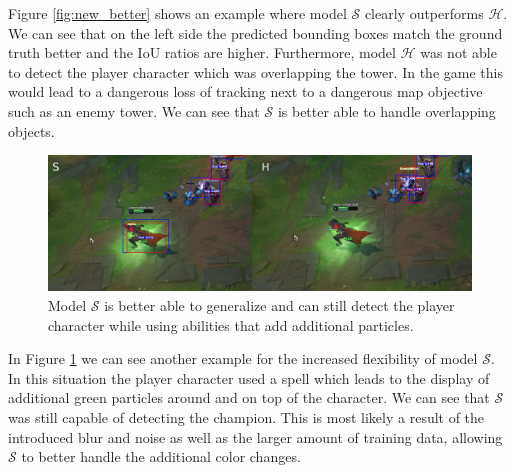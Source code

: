 Figure \ref{fig:new_better} shows an example where model $\mathcal{S}$ clearly outperforms $\mathcal{H}$.
We can see that on the left side the predicted bounding boxes match the ground truth better and the IoU ratios are higher.
Furthermore, model $\mathcal{H}$ was not able to detect the player character which was overlapping the tower.
In the game this would lead to a dangerous loss of tracking next to a dangerous map objective such as an enemy tower.
We can see that $\mathcal{S}$ is better able to handle overlapping objects.
\begin{figure}
\centering
\includegraphics[width=\textwidth]{figures/new_better2.jpg}
\caption{Model $\mathcal{S}$ is better able to generalize and can still detect the player character while using abilities that add additional particles.}
\label{fig:new_better2}
\end{figure}
In Figure \ref{fig:new_better2} we can see another example for the increased flexibility of model $\mathcal{S}$.
In this situation the player character used a spell which leads to the display of additional green particles around and on top of the character.
We can see that $\mathcal{S}$ was still capable of detecting the champion.
This is most likely a result of the introduced blur and noise as well as the larger amount of training data, allowing $\mathcal{S}$ to better handle the additional color changes.

